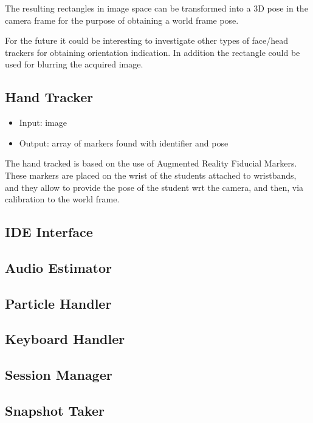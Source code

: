 \documentclass[a4paper,notitlepage,onecolumn]{hitec}  %
\begin{document}
The resulting rectangles in image space can be transformed into a 3D pose in the camera frame for the purpose of obtaining a world frame pose. 

For the future it could be interesting to investigate other types of face/head trackers for obtaining orientation indication. In addition the rectangle could be used for blurring the acquired image.

\subsection{Hand Tracker}

\begin{itemize}
	\item Input: image
	\item Output: array of markers found with identifier and pose
\end{itemize}

The hand tracked is based on the use of Augmented Reality Fiducial Markers. These markers are placed on the wrist of the students attached to wristbands, and they allow to provide the pose of the student wrt the camera, and then, via calibration to the world frame.

\subsection{IDE Interface}


\subsection{Audio Estimator}

\subsection{Particle Handler}

\subsection{Keyboard Handler}

\subsection{Session Manager}

\subsection{Snapshot Taker}



\end{document}
